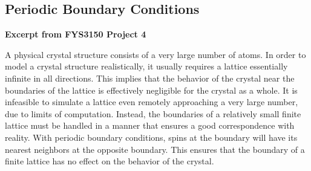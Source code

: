 \subsection{Periodic Boundary Conditions}\label{sec:pbc theory}
\textbf{Excerpt from FYS3150 Project 4}

A physical crystal structure consists of a very large number of atoms. In order to model a crystal structure realistically, it usually requires a lattice essentially infinite in all directions. This implies that the behavior of the crystal near the boundaries of the lattice is effectively negligible for the crystal as a whole. It is infeasible to simulate a lattice even remotely approaching a very large number, due to limits of computation. Instead, the boundaries of a relatively small finite lattice must be handled in a manner that ensures a good correspondence with reality. With periodic boundary conditions, spins at the boundary will have its nearest neighbors at the opposite boundary. This ensures that the boundary of a finite lattice has no effect on the behavior of the crystal.
